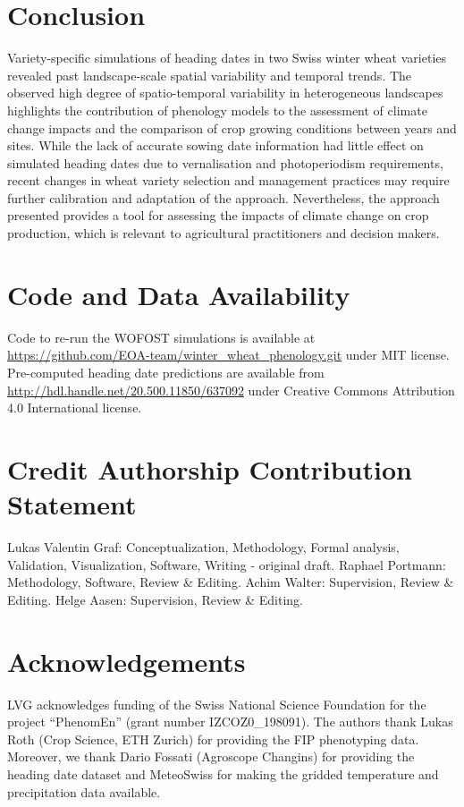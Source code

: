 \section{Conclusion}
Variety-specific simulations of heading dates in two Swiss winter wheat varieties revealed past landscape-scale spatial variability and temporal trends. The observed high degree of spatio-temporal variability in heterogeneous landscapes highlights the contribution of phenology models to the assessment of climate change impacts and the comparison of crop growing conditions between years and sites. While the lack of accurate sowing date information had little effect on simulated heading dates due to vernalisation and photoperiodism requirements, recent changes in wheat variety selection and management practices may require further calibration and adaptation of the approach. Nevertheless, the approach presented provides a tool for assessing the impacts of climate change on crop production, which is relevant to agricultural practitioners and decision makers.

\section*{Code and Data Availability}
Code to re-run the \gls{WOFOST} simulations is available at \url{https://github.com/EOA-team/winter_wheat_phenology.git} under MIT license. Pre-computed heading date predictions are available from \url{http://hdl.handle.net/20.500.11850/637092} under Creative Commons Attribution 4.0 International license.

\section*{Credit Authorship Contribution Statement}
Lukas Valentin Graf: Conceptualization, Methodology, Formal analysis, Validation, Visualization, Software, Writing - original draft. Raphael Portmann: Methodology, Software, Review \& Editing. Achim Walter: Supervision, Review \& Editing. Helge Aasen:  Supervision, Review \& Editing.

\section*{Acknowledgements}
LVG acknowledges funding of the Swiss National Science Foundation for the project “PhenomEn” (grant number IZCOZ0\_198091). The authors thank Lukas Roth (Crop Science, ETH Zurich) for providing the FIP phenotyping data. Moreover, we thank Dario Fossati (Agroscope Changins) for providing the heading date dataset and MeteoSwiss for making the gridded temperature and precipitation data available.